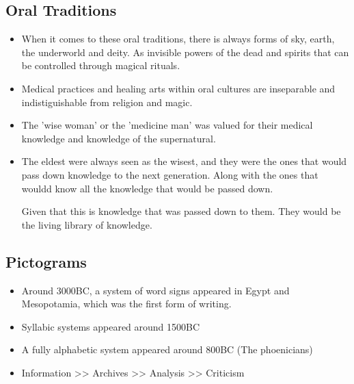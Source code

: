 \documentclass{article}
\begin{document}
\subsection{Oral Traditions}
\begin{itemize}
  \item When it comes to these oral traditions, there
    is always forms of sky, earth, the underworld and deity.
    As invisible powers of the dead and spirits that can be controlled
    through magical rituals.
  \item Medical practices and healing arts within oral cultures are
    inseparable and indistiguishable from religion and magic.
  \item The 'wise woman' or the 'medicine man' was valued
    for their medical knowledge and knowledge of the supernatural.
  \item The eldest were always seen as the wisest, and they were the ones
    that would pass down knowledge to the next generation. Along with
    the ones that wouldd know all the knowledge that would be passed down.

    Given that this is knowledge that was passed down to them.
    They would be the living library of knowledge.
\end{itemize}

\subsection{Pictograms}
\begin{itemize}
  \item Around 3000BC, a system of word signs appeared in Egypt
    and Mesopotamia, which was the first form of writing.
  \item Syllabic systems appeared around 1500BC
  \item A fully alphabetic system appeared around 800BC (The phoenicians)
  \item Information >> Archives >> Analysis >> Criticism
\end{itemize}
\end{document}
